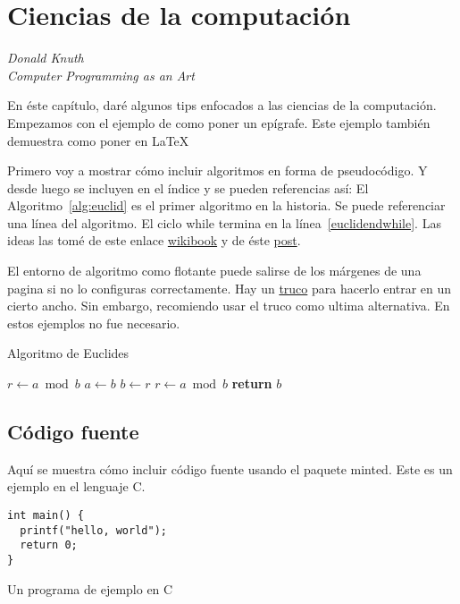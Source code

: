 \chapter{Ciencias de la computación}
\label{chap:cs}

\epigraph{}{\textit{Donald Knuth \\ Computer Programming as an Art}}

En éste capítulo, daré algunos tips enfocados a las ciencias de la computación.
Empezamos con el ejemplo de como poner un epígrafe.
Este ejemplo también demuestra como poner  en \LaTeX{}

Primero voy a mostrar cómo incluir algoritmos en forma de pseudocódigo.
Y desde luego se incluyen en el índice y se pueden referencias así: 
El Algoritmo~\ref{alg:euclid} es el primer algoritmo en la historia.
Se puede referenciar una línea del algoritmo.
El ciclo while termina en la línea~\ref{euclidendwhile}.
Las ideas las tomé de este enlace \href{https://en.wikibooks.org/wiki/LaTeX/Algorithms#Typesetting_using_the_algorithmicx_package}{wikibook} y de éste \href{https://tex.stackexchange.com/questions/229355/algorithm-algorithmic-algorithmicx-algorithm2e-algpseudocode-confused}{post}.

El entorno de algoritmo como flotante puede salirse de los márgenes de una pagina si no lo configuras correctamente.
Hay un \href{https://tex.stackexchange.com/questions/350434/adjust-width-of-algorithm-float}{truco} para hacerlo entrar en un cierto ancho.
Sin embargo, recomiendo usar el truco como ultima alternativa.
En estos ejemplos no fue necesario.

\begin{algorithm}[H]
\caption{Algoritmo de Euclides}
\label{alg:euclid}
\begin{algorithmic}[1] %
     
    \State $r\gets a \bmod b$
     
        \State $a \gets b$
        \State $b \gets r$
        \State $r \gets a \bmod b$
    \EndWhile\label{euclidendwhile}
    \State \textbf{return} $b$
    \EndProcedure
\end{algorithmic}
\end{algorithm}


\section{Código fuente}
Aquí se muestra cómo incluir código fuente usando el paquete minted.
Este es un ejemplo en el lenguaje C.
\begin{listing}
\begin{verbatim}
int main() {
  printf("hello, world");
  return 0;
}
\end{verbatim}
\caption{Un programa de ejemplo en C}\label{lst:hello}
\end{listing}

